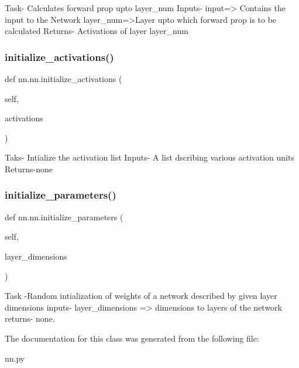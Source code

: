 \begin{DoxyVerb}Task- Calculates forward prop upto layer_num
Inputs- input=> Contains the input to the Network
layer_num=>Layer upto which forward prop is to be calculated
Returns- Activations of layer layer_num
\end{DoxyVerb}
 \mbox{\label{classnn_1_1nn_a1f6dba2cb835e0d723f39106534062a7}} 
\subsubsection{\texorpdfstring{initialize\+\_\+activations()}{initialize\_activations()}}
{\footnotesize\ttfamily def nn.\+nn.\+initialize\+\_\+activations (\begin{DoxyParamCaption}\item[{}]{self,  }\item[{}]{activations }\end{DoxyParamCaption})}

\begin{DoxyVerb}Taks- Intialize the activation list 
Inputs- A list dscribing various activation units
Returns-none
\end{DoxyVerb}
 \mbox{\label{classnn_1_1nn_a9821fed1369b4d709fe297fe9e07d97b}} 
\subsubsection{\texorpdfstring{initialize\+\_\+parameters()}{initialize\_parameters()}}
{\footnotesize\ttfamily def nn.\+nn.\+initialize\+\_\+parameters (\begin{DoxyParamCaption}\item[{}]{self,  }\item[{}]{layer\+\_\+dimensions }\end{DoxyParamCaption})}

\begin{DoxyVerb}Task -Random intialization of weights of a network described by given layer dimensions
inputs- layer_dimensions => dimensions to layers of the network
returns- none.
\end{DoxyVerb}
 

The documentation for this class was generated from the following file\+:\begin{DoxyCompactItemize}
\item 
nn.\+py\end{DoxyCompactItemize}
